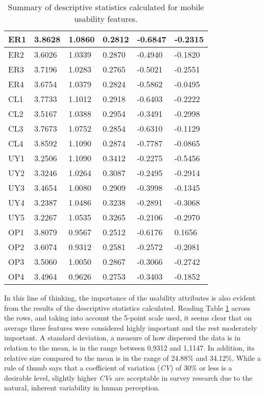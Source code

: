 \documentclass[preprint,12pt]{elsarticle}
\begin{document}
\begin{table}[]
\begin{tabular}{|l|l|l|l|l|l|}
ER1 & 3.8628  & 1.0860 & 0.2812 & -0.6847 & -0.2315  \\ \hline
ER2 & 3.6026  & 1.0339 & 0.2870 & -0.4940 & -0.1820  \\ \hline
ER3 & 3.7196  & 1.0283 & 0.2765 & -0.5021 & -0.2551  \\ \hline
ER4 & 3.6754  & 1.0379 & 0.2824 & -0.5862 & -0.0495  \\ \hline
CL1 & 3.7733  & 1.1012 & 0.2918 & -0.6403 & -0.2222  \\ \hline
CL2 & 3.5167  & 1.0388 & 0.2954 & -0.3491 & -0.2998  \\ \hline
CL3 & 3.7673  & 1.0752 & 0.2854 & -0.6310 & -0.1129  \\ \hline
CL4 & 3.8592  & 1.1090 & 0.2874 & -0.7787 & -0.0865  \\ \hline
UY1 & 3.2506  & 1.1090 & 0.3412 & -0.2275 & -0.5456  \\ \hline
UY2 & 3.3246  & 1.0264 & 0.3087 & -0.2495 & -0.2914  \\ \hline
UY3 & 3.4654  & 1.0080 & 0.2909 & -0.3998 & -0.1345  \\ \hline
UY4 & 3.2387  & 1.0486 & 0.3238 & -0.2891 & -0.3068  \\ \hline
UY5 & 3.2267  & 1.0535 & 0.3265 & -0.2106 & -0.2970  \\ \hline
OP1 & 3.8079  & 0.9567 & 0.2512 & -0.6176 & 0.1656   \\ \hline
OP2 & 3.6074  & 0.9312 & 0.2581 & -0.2572 & -0.2081  \\ \hline
OP3 & 3.5060  & 1.0050 & 0.2867 & -0.3066 & -0.2742  \\ \hline
OP4 & 3.4964  & 0.9626 & 0.2753 & -0.3403 & -0.1852  \\ \hline
\end{tabular}
\caption{\label{tab:ds-all-features}Summary of descriptive statistics calculated for mobile usability features.}
\end{table}

In this line of thinking, the importance of the usability attributes is also evident from the results of the descriptive statistics calculated. Reading Table \ref{tab:ds-all-features} across the rows, and taking into account the 5-point scale used, it seems clear that on average three features were considered highly important and the rest moderately important. A standard deviation, a measure of how dispersed the data is in relation to the mean, is in the range between 0,9312 and 1,1147. In addition, its relative size compared to the mean is in the range of 24.88\% and 34.12\%. While a rule of thumb says that a coefficient of variation (\textit{CV}) of 30\% or less is a desirable level, slightly higher \textit{CV}s are acceptable in survey research due to the natural, inherent variability in human perception. 
\end{document}
